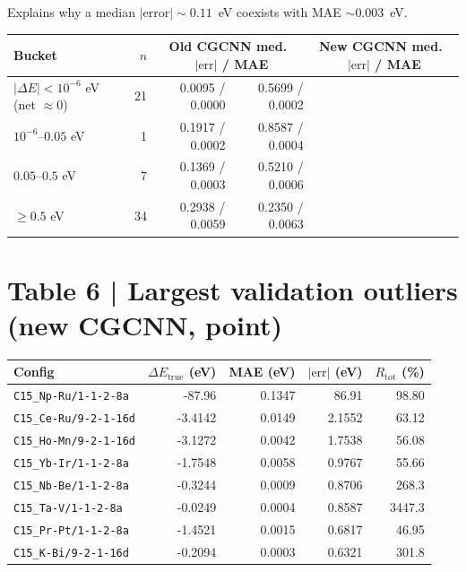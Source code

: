 \documentclass[11pt,a4paper]{article}
\begin{document}
Explains why a median $|\mathrm{error}| \sim 0.11$~eV coexists with MAE $\sim 0.003$~eV.

\begin{center}
\footnotesize
\begin{tabular}{l r rr rr}
  \toprule
  Bucket & $n$ & \multicolumn{2}{c}{Old CGCNN med.\ $|\mathrm{err}|$ / MAE} & \multicolumn{2}{c}{New CGCNN med.\ $|\mathrm{err}|$ / MAE} \\
  \midrule
  $|\Delta E|<10^{-6}$ eV (net $\approx 0$) & 21 & 0.0095 / 0.0000 & 0.5699 / 0.0002 \\
  $10^{-6}$--$0.05$ eV & 1 & 0.1917 / 0.0002 & 0.8587 / 0.0004 \\
  $0.05$--$0.5$ eV & 7 & 0.1369 / 0.0003 & 0.5210 / 0.0006 \\
  $\ge 0.5$ eV & 34 & 0.2938 / 0.0059 & 0.2350 / 0.0063 \\
  \bottomrule
\end{tabular}
\end{center}

\section*{Table 6 | Largest validation outliers (new CGCNN, point)}

\begin{center}
\footnotesize
\begin{tabular}{l r r r r}
  \toprule
  Config & $\Delta E_{\mathrm{true}}$ (eV) & MAE (eV) & $|\mathrm{err}|$ (eV) & $R_{\mathrm{tot}}$ (\%) \\
  \midrule
  \texttt{C15\_Np-Ru/1-1-2-8a} & -87.96 & 0.1347 & 86.91 & 98.80 \\
  \texttt{C15\_Ce-Ru/9-2-1-16d} & -3.4142 & 0.0149 & 2.1552 & 63.12 \\
  \texttt{C15\_Ho-Mn/9-2-1-16d} & -3.1272 & 0.0042 & 1.7538 & 56.08 \\
  \texttt{C15\_Yb-Ir/1-1-2-8a} & -1.7548 & 0.0058 & 0.9767 & 55.66 \\
  \texttt{C15\_Nb-Be/1-1-2-8a} & -0.3244 & 0.0009 & 0.8706 & 268.3 \\
  \texttt{C15\_Ta-V/1-1-2-8a} & -0.0249 & 0.0004 & 0.8587 & 3447.3 \\
  \texttt{C15\_Pr-Pt/1-1-2-8a} & -1.4521 & 0.0015 & 0.6817 & 46.95 \\
  \texttt{C15\_K-Bi/9-2-1-16d} & -0.2094 & 0.0003 & 0.6321 & 301.8 \\
  \bottomrule
\end{tabular}
\end{center}
\end{document}
